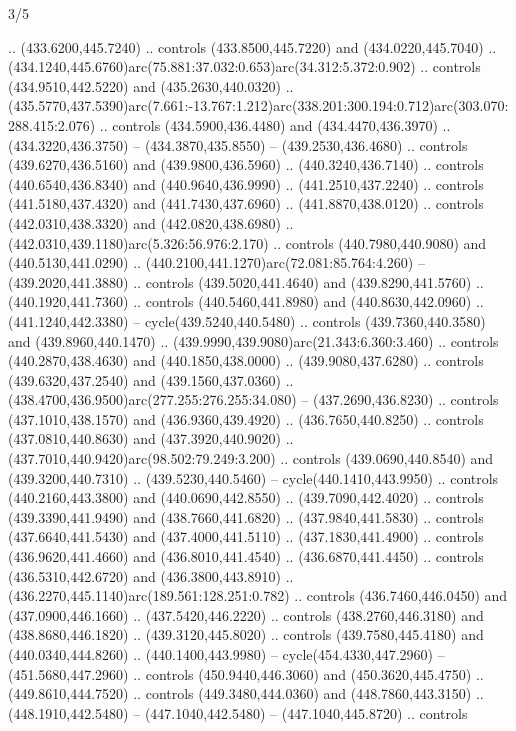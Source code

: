\begin{flagdescription}{3/5}
\begin{scope}[shift={(0.5\flaglength,0.5\flagwidth)},scale=\flagwidth/510]
\begin{scope}[y=0.80pt, x=0.80pt, yscale=-1.06, xscale=1.06,yshift=-240pt,xshift=-400pt]
\begin{scope}[cm={{0.83333,0.0,0.0,0.83333,(154.64672,48.64761)}}]
\begin{scope}[cm={{0.93334,0.0,0.0,0.93334,(-4.86471,22.64035)}}]
\begin{scope}[draw=black]
  .. (433.6200,445.7240) .. controls (433.8500,445.7220) and (434.0220,445.7040)
  .. (434.1240,445.6760)arc(75.881:37.032:0.653)arc(34.312:5.372:0.902) ..
  controls (434.9510,442.5220) and (435.2630,440.0320) ..
  (435.5770,437.5390)arc(7.661:-13.767:1.212)arc(338.201:300.194:0.712)arc(303.070:288.415:2.076)
  .. controls (434.5900,436.4480) and (434.4470,436.3970) .. (434.3220,436.3750)
  -- (434.3870,435.8550) -- (439.2530,436.4680) .. controls (439.6270,436.5160)
  and (439.9800,436.5960) .. (440.3240,436.7140) .. controls (440.6540,436.8340)
  and (440.9640,436.9990) .. (441.2510,437.2240) .. controls (441.5180,437.4320)
  and (441.7430,437.6960) .. (441.8870,438.0120) .. controls (442.0310,438.3320)
  and (442.0820,438.6980) .. (442.0310,439.1180)arc(5.326:56.976:2.170) ..
  controls (440.7980,440.9080) and (440.5130,441.0290) ..
  (440.2100,441.1270)arc(72.081:85.764:4.260) -- (439.2020,441.3880) .. controls
  (439.5020,441.4640) and (439.8290,441.5760) .. (440.1920,441.7360) .. controls
  (440.5460,441.8980) and (440.8630,442.0960) .. (441.1240,442.3380) --
  cycle(439.5240,440.5480) .. controls (439.7360,440.3580) and
  (439.8960,440.1470) .. (439.9990,439.9080)arc(21.343:6.360:3.460) .. controls
  (440.2870,438.4630) and (440.1850,438.0000) .. (439.9080,437.6280) .. controls
  (439.6320,437.2540) and (439.1560,437.0360) ..
  (438.4700,436.9500)arc(277.255:276.255:34.080) -- (437.2690,436.8230) ..
  controls (437.1010,438.1570) and (436.9360,439.4920) .. (436.7650,440.8250) ..
  controls (437.0810,440.8630) and (437.3920,440.9020) ..
  (437.7010,440.9420)arc(98.502:79.249:3.200) .. controls (439.0690,440.8540)
  and (439.3200,440.7310) .. (439.5230,440.5460) -- cycle(440.1410,443.9950) ..
  controls (440.2160,443.3800) and (440.0690,442.8550) .. (439.7090,442.4020) ..
  controls (439.3390,441.9490) and (438.7660,441.6820) .. (437.9840,441.5830) ..
  controls (437.6640,441.5430) and (437.4000,441.5110) .. (437.1830,441.4900) ..
  controls (436.9620,441.4660) and (436.8010,441.4540) .. (436.6870,441.4450) ..
  controls (436.5310,442.6720) and (436.3800,443.8910) ..
  (436.2270,445.1140)arc(189.561:128.251:0.782) .. controls (436.7460,446.0450)
  and (437.0900,446.1660) .. (437.5420,446.2220) .. controls (438.2760,446.3180)
  and (438.8680,446.1820) .. (439.3120,445.8020) .. controls (439.7580,445.4180)
  and (440.0340,444.8260) .. (440.1400,443.9980) -- cycle(454.4330,447.2960) --
  (451.5680,447.2960) .. controls (450.9440,446.3060) and (450.3620,445.4750) ..
  (449.8610,444.7520) .. controls (449.3480,444.0360) and (448.7860,443.3150) ..
  (448.1910,442.5480) -- (447.1040,442.5480) -- (447.1040,445.8720) .. controls

\end{scope}
\end{scope}
\end{scope}
\end{scope}
\end{scope}
\end{flagdescription}
